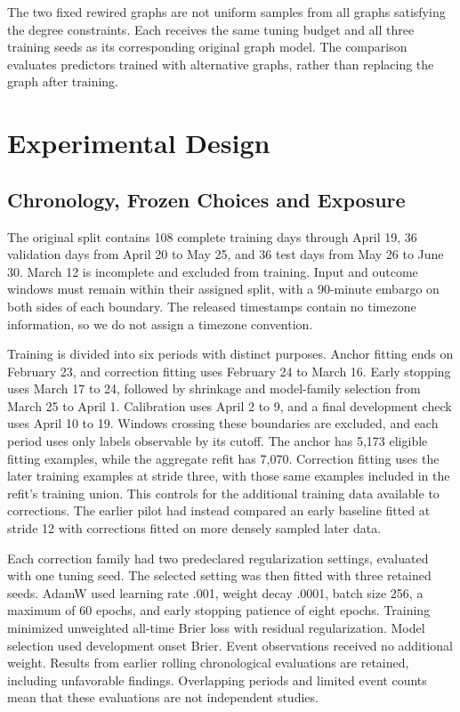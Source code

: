 \documentclass{llncs}
\begin{document}
The two fixed rewired graphs are not uniform samples from all graphs satisfying the degree constraints. Each receives the same tuning budget and all three training seeds as its corresponding original graph model. The comparison evaluates predictors trained with alternative graphs, rather than replacing the graph after training.






\section{Experimental Design}
\subsection{Chronology, Frozen Choices and Exposure}
The original split contains 108 complete training days through April 19, 36 validation days from April 20 to May 25, and 36 test days from May 26 to June 30. March 12 is incomplete and excluded from training. Input and outcome windows must remain within their assigned split, with a 90-minute embargo on both sides of each boundary. The released timestamps contain no timezone information, so we do not assign a timezone convention.

Training is divided into six periods with distinct purposes. Anchor fitting ends on February 23, and correction fitting uses February 24 to March 16. Early stopping uses March 17 to 24, followed by shrinkage and model-family selection from March 25 to April 1. Calibration uses April 2 to 9, and a final development check uses April 10 to 19. Windows crossing these boundaries are excluded, and each period uses only labels observable by its cutoff. The anchor has 5,173 eligible fitting examples, while the aggregate refit has 7,070. Correction fitting uses the later training examples at stride three, with those same examples included in the refit's training union. This controls for the additional training data available to corrections. The earlier pilot had instead compared an early baseline fitted at stride 12 with corrections fitted on more densely sampled later data.

Each correction family had two predeclared regularization settings, evaluated with one tuning seed. The selected setting was then fitted with three retained seeds. AdamW used learning rate .001, weight decay .0001, batch size 256, a maximum of 60 epochs, and early stopping patience of eight epochs. Training minimized unweighted all-time Brier loss with residual regularization. Model selection used development onset Brier. Event observations received no additional weight. Results from earlier rolling chronological evaluations are retained, including unfavorable findings. Overlapping periods and limited event counts mean that these evaluations are not independent studies.
\end{document}
